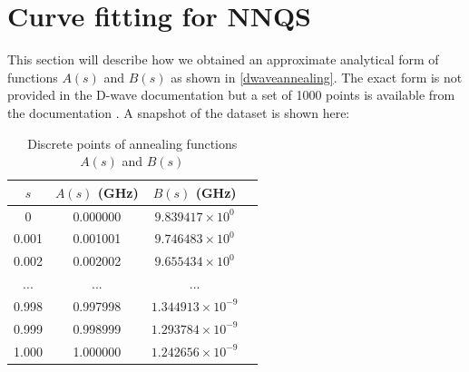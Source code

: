 \chapter{Curve fitting for NNQS}\label{appendix:curvefitting}
This section will describe how we obtained an approximate analytical form of functions $A(s)$ and $B(s)$ as shown in \autoref{dwaveannealing}. The exact form is not provided in the D-wave documentation but a set of 1000 points is available from the documentation \cite{dwavefunctions}. A snapshot of the dataset is shown here:
\begin{table}[!h]
    \centering
    \begin{tabular}{cccc}
    \hline
    $s$ & $A(s)$ (GHz) & $B(s)$ (GHz)\\
    \hline
    0 & 0.000000 & $9.839417 \times 10^0$ \\
    0.001 & 0.001001 & $9.746483 \times 10^0$ \\
    0.002 & 0.002002 & $9.655434 \times 10^0$ \\
    ... & ... & ... \\
    0.998 & 0.997998 & $1.344913 \times 10^{-9}$\\
    0.999 & 0.998999 & $1.293784 \times 10^{-9}$\\
    1.000 & 1.000000 & $1.242656 \times 10^{-9}$\\
    \hline
    \end{tabular}
    \caption{Discrete points of annealing functions $A(s)$ and $B(s)$}
    \label{tab:dwavefunction}
\end{table}


